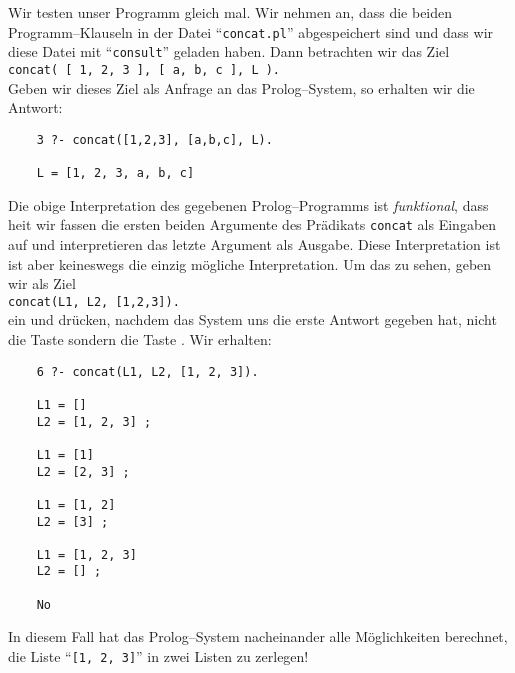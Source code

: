 Wir testen unser Programm gleich mal.  Wir nehmen an, dass die beiden Programm--Klauseln in der Datei
``\texttt{concat.pl}'' abgespeichert sind und dass wir diese Datei mit ``\texttt{consult}'' geladen haben.
Dann betrachten wir das Ziel \\[0.1cm]
\hspace*{1.3cm} \texttt{concat( [ 1, 2, 3 ], [ a, b, c ], L ).} \\[0.1cm]
Geben wir dieses Ziel als Anfrage an das Prolog--System, so erhalten wir die Antwort:
\begin{verbatim}
    3 ?- concat([1,2,3], [a,b,c], L).

    L = [1, 2, 3, a, b, c] 
\end{verbatim}
Die obige Interpretation des gegebenen Prolog--Programms ist \emph{funktional}, dass hei\3t 
wir fassen die ersten beiden Argumente des Pr\"{a}dikats \texttt{concat} als Eingaben auf und 
interpretieren das letzte Argument als Ausgabe.  Diese Interpretation ist ist aber keineswegs die 
einzig m\"{o}gliche Interpretation.  Um das zu sehen, geben wir als Ziel \\[0.1cm]
\hspace*{1.3cm} \texttt{concat(L1, L2, [1,2,3]).} \\[0.1cm]
ein und dr\"{u}cken, nachdem das System uns die erste Antwort gegeben hat, nicht die Taste 
 sondern die Taste \fbox{\texttt{;}}.  Wir erhalten:
\begin{verbatim}
    6 ?- concat(L1, L2, [1, 2, 3]).

    L1 = []
    L2 = [1, 2, 3] ;

    L1 = [1]
    L2 = [2, 3] ;

    L1 = [1, 2]
    L2 = [3] ;

    L1 = [1, 2, 3]
    L2 = [] ;

    No
\end{verbatim}
In diesem Fall hat das Prolog--System nacheinander alle M\"{o}glichkeiten berechnet, die 
Liste ``\texttt{[1, 2, 3]}'' in zwei Listen zu zerlegen!

